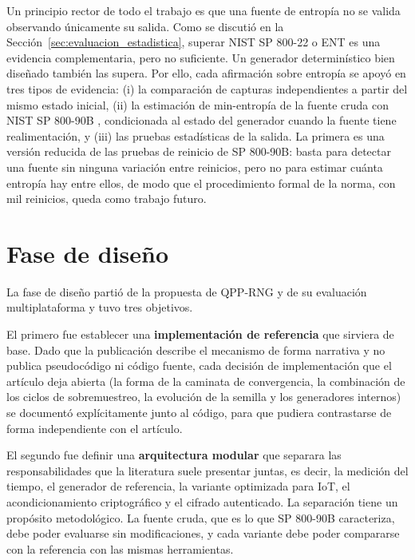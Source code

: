 Un principio rector de todo el trabajo es que una fuente de entropía no se valida observando únicamente su salida. Como se discutió en la Sección~\ref{sec:evaluacion_estadistica}, superar NIST SP 800-22 o ENT es una evidencia complementaria, pero no suficiente. Un generador determinístico bien diseñado también las supera. Por ello, cada afirmación sobre entropía se apoyó en tres tipos de evidencia: (i) la comparación de capturas independientes a partir del mismo estado inicial, (ii) la estimación de min-entropía de la fuente cruda con NIST SP 800-90B \cite{Turan2018RecommendationGeneration}, condicionada al estado del generador cuando la fuente tiene realimentación, y (iii) las pruebas estadísticas de la salida. La primera es una versión reducida de las pruebas de reinicio de SP 800-90B: basta para detectar una fuente sin ninguna variación entre reinicios, pero no para estimar cuánta entropía hay entre ellos, de modo que el procedimiento formal de la norma, con mil reinicios, queda como trabajo futuro.

\section{Fase de diseño}

La fase de diseño partió de la propuesta de QPP-RNG \cite{Kuang2025QPP-RNG:Randomness,Kuang2025IID-BasedJitter} y de su evaluación multiplataforma \cite{Vrana2025RawEvaluation} y tuvo tres objetivos.

El primero fue establecer una \textbf{implementación de referencia} que sirviera de base. Dado que la publicación describe el mecanismo de forma narrativa y no publica pseudocódigo ni código fuente, cada decisión de implementación que el artículo deja abierta (la forma de la caminata de convergencia, la combinación de los ciclos de sobremuestreo, la evolución de la semilla y los generadores internos) se documentó explícitamente junto al código, para que pudiera contrastarse de forma independiente con el artículo.

El segundo fue definir una \textbf{arquitectura modular} que separara las responsabilidades que la literatura suele presentar juntas, es decir, la medición del tiempo, el generador de referencia, la variante optimizada para IoT, el acondicionamiento criptográfico y el cifrado autenticado. La separación tiene un propósito metodológico. La fuente cruda, que es lo que SP 800-90B caracteriza, debe poder evaluarse sin modificaciones, y cada variante debe poder compararse con la referencia con las mismas herramientas.

